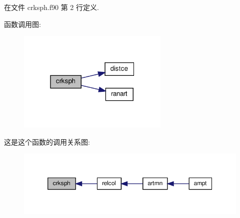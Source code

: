 在文件 crksph.\+f90 第 2 行定义.

函数调用图\+:
\nopagebreak
\begin{figure}[H]
\begin{center}
\leavevmode
\includegraphics[width=205pt]{crksph_8f90_abab9ec0d6f0ca2ddb98e9f7d00ffb425_cgraph}
\end{center}
\end{figure}
这是这个函数的调用关系图\+:
\nopagebreak
\begin{figure}[H]
\begin{center}
\leavevmode
\includegraphics[width=350pt]{crksph_8f90_abab9ec0d6f0ca2ddb98e9f7d00ffb425_icgraph}
\end{center}
\end{figure}
